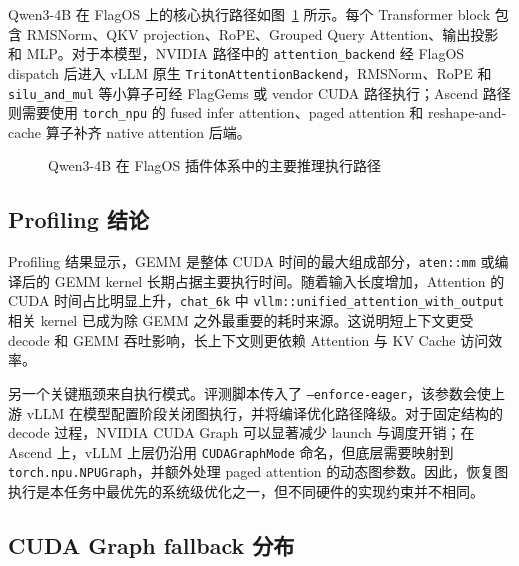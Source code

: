 \documentclass[UTF8,10.5pt]{ctexart}
\newcommand{\code}[1]{\texttt{#1}}
\begin{document}
Qwen3-4B 在 FlagOS 上的核心执行路径如图~\ref{fig:route} 所示。每个 Transformer block 包含 RMSNorm、QKV projection、RoPE、Grouped Query Attention、输出投影和 MLP。对于本模型，NVIDIA 路径中的 \code{attention\_backend} 经 FlagOS dispatch 后进入 vLLM 原生 \code{TritonAttentionBackend}，RMSNorm、RoPE 和 \code{silu\_and\_mul} 等小算子可经 FlagGems 或 vendor CUDA 路径执行；Ascend 路径则需要使用 \code{torch\_npu} 的 fused infer attention、paged attention 和 reshape-and-cache 算子补齐 native attention 后端。

\begin{figure}[H]
\centering
{}
\caption{Qwen3-4B 在 FlagOS 插件体系中的主要推理执行路径}
\label{fig:route}
\end{figure}

\subsection{Profiling 结论}

Profiling 结果显示，GEMM 是整体 CUDA 时间的最大组成部分，\code{aten::mm} 或编译后的 GEMM kernel 长期占据主要执行时间。随着输入长度增加，Attention 的 CUDA 时间占比明显上升，\code{chat\_6k} 中 \code{vllm::unified\_attention\_with\_output} 相关 kernel 已成为除 GEMM 之外最重要的耗时来源。这说明短上下文更受 decode 和 GEMM 吞吐影响，长上下文则更依赖 Attention 与 KV Cache 访问效率。

另一个关键瓶颈来自执行模式。评测脚本传入了 \code{--enforce-eager}，该参数会使上游 vLLM 在模型配置阶段关闭图执行，并将编译优化路径降级。对于固定结构的 decode 过程，NVIDIA CUDA Graph 可以显著减少 launch 与调度开销；在 Ascend 上，vLLM 上层仍沿用 \code{CUDAGraphMode} 命名，但底层需要映射到 \code{torch.npu.NPUGraph}，并额外处理 paged attention 的动态图参数。因此，恢复图执行是本任务中最优先的系统级优化之一，但不同硬件的实现约束并不相同。

\subsection{CUDA Graph fallback 分布}
\end{document}
